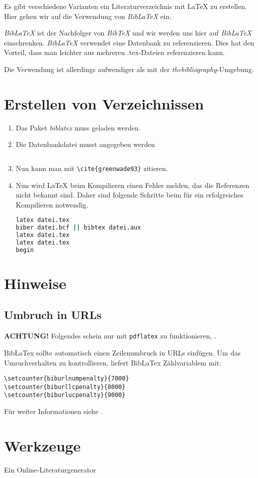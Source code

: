 \documentclass[a4paper]{article}
\begin{document}
Es gibt verschiedene Varianten ein Literaturverzeichnis mit \LaTeX{} zu
erstellen. Hier gehen wir auf die Verwendung von \emph{BibLaTeX} ein.

\tableofcontents

\emph{BibLaTeX} ist der Nachfolger von \emph{BibTeX} \cite{wikiBibliography} und wir werden uns hier auf
\emph{BibLaTeX} einschrenken. \emph{BibLaTeX} verwendet eine Datenbank zu
referenzieren. Dies hat den Vorteil, dass man leichter aus mehreren .tex-Dateien
referenzieren kann.


Die Verwendung ist allerdings aufwendiger als mit der
\emph{thebibliography}-Umgebung.

\section{Erstellen von Verzeichnissen}
\begin{enumerate}
	\item Das Paket \emph{biblatex} muss geladen werden.
	\item Die Datenbankdatei musst angegeben werden
		\begin{lstlisting}

		\end{lstlisting}
	\item Nun kann man mit \verb+\cite{greenwade93}+ zitieren.
	\item Nun wird \LaTeX{} beim Kompilieren einen Fehler melden, das die Referenzen nicht bekannt sind. Daher sind folgende Schritte beim für ein erfolgreiches Kompilieren notwendig.
		\begin{lstlisting}[language=sh]
latex datei.tex
biber datei.bcf || bibtex datei.aux
latex datei.tex
latex datei.tex
begin
		\end{lstlisting}
\end{enumerate}

\printbibliography

\section{Hinweise}
\subsection{Umbruch in URLs}
{\bf ACHTUNG!} Folgendes schein nur mit \verb+pdflatex+ zu funktionieren, \cite{urlLineBreakWithBibLatex}.

BibLaTex sollte automatisch einen Zeilenumbruch in URLs einfügen.
Um das Umruchverhalten zu kontrollieren, liefert BibLaTex Zählvariablem mit:
\begin{lstlisting}
\setcounter{biburlnumpenalty}{7000}
\setcounter{biburllcpenalty}{8000}
\setcounter{biburlucpenalty}{9000}
\end{lstlisting}

Für weiter Informationen siehe \cite{manBibLaTeX}.

\section{Werkzeuge}
Ein Online-Literaturgenerator \cite{litGen}

\printbibliography
\end{document}
